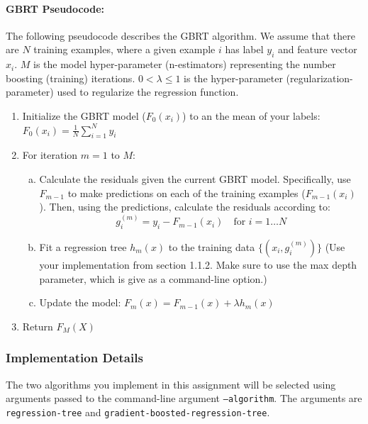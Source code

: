 \documentclass[11pt]{article}
\begin{document}
\paragraph{GBRT Pseudocode: } The following pseudocode describes the GBRT algorithm. We assume that there are $N$ training examples, where a given example $i$ has label $y_i$ and feature vector $x_i$. $M$ is the model hyper-parameter (n-estimators) representing the number boosting (training) iterations. $0 < \lambda \le 1$ is the hyper-parameter (regularization-parameter) used to regularize the regression function.\\
\begin{enumerate}
\item Initialize the GBRT model ($F_0(x_i)$) to an the mean of your labels:\\
$F_0(x_i)=\frac{1}{N}\sum_{i=1}^N y_i$
\item For iteration $m = 1$ to $M$:
\begin{enumerate}[(a)]
\item Calculate the residuals given the current GBRT model. Specifically, use
  $F_{m-1}$ to make predictions on each of the training examples
  ($F_{m-1}(x_i)$). Then, using the predictions, calculate the residuals
  according to:
 \begin{equation}
   g_i^{(m)} = y_i - F_{m-1}(x_i) \quad\text{for } i = 1 \ldots N
 \end{equation}
\item Fit a regression tree $h_m(x)$ to the training data $\{ (x_i, g^{(m)}_i) \}$
  (Use your implementation from section 1.1.2. Make sure to use the max depth
  parameter, which is give as a command-line option.)
\item Update the model: $F_m(x) = F_{m-1}(x) + \lambda h_m(x)$
\end{enumerate}
\item Return $F_M(X)$
\end{enumerate}

\newpage
\subsubsection{Implementation Details}
The two algorithms you implement in this assignment will be selected using arguments passed to the command-line argument {\tt --algorithm}. The arguments are {\tt regression-tree} and {\tt gradient-boosted-regression-tree}.
\end{document}
